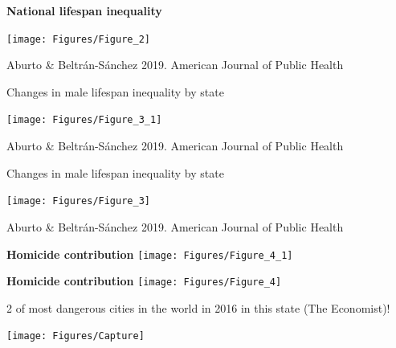 \documentclass[xcolor={dvipsnames}]{beamer}
\begin{document}
\begin{frame}
	\begin{center}
		\Large{\textbf{National lifespan inequality}}
	\end{center}

	\hspace*{-1cm}   
	\texttt{[image: Figures/Figure\_2]}
	
	\tiny{Aburto \& Beltr\'an-S\'anchez 2019. American Journal of Public Health}

\end{frame}


\begin{frame}
	\begin{center}
		\Large{{Changes in male lifespan inequality by state}}

		\texttt{[image: Figures/Figure\_3\_1]}
		\end{center}
		
		\vspace*{-.5cm}
		\tiny{Aburto \& Beltr\'an-S\'anchez 2019. American Journal of Public Health}

\end{frame}

\begin{frame}
	\begin{center}
		\Large{{Changes in male lifespan inequality by state}}

		\texttt{[image: Figures/Figure\_3]}
		\end{center}
		
		\vspace*{-.5cm}
\tiny{Aburto \& Beltr\'an-S\'anchez 2019. American Journal of Public Health}
\end{frame}


\begin{frame}
	\begin{center}
		\Large{\textbf{Homicide contribution}}
		\texttt{[image: Figures/Figure\_4\_1]}
	\end{center}

\end{frame}

\begin{frame}
	\begin{center}
		\Large{\textbf{Homicide contribution}}
		\texttt{[image: Figures/Figure\_4]}
	\end{center}

\end{frame}



\begin{frame}

\Large{
2 of most dangerous cities in the world in 2016 in this state (The Economist)!

				\begin{center}
		\texttt{[image: Figures/Capture]}
				\end{center}				

}
\end{frame}
\end{document}
